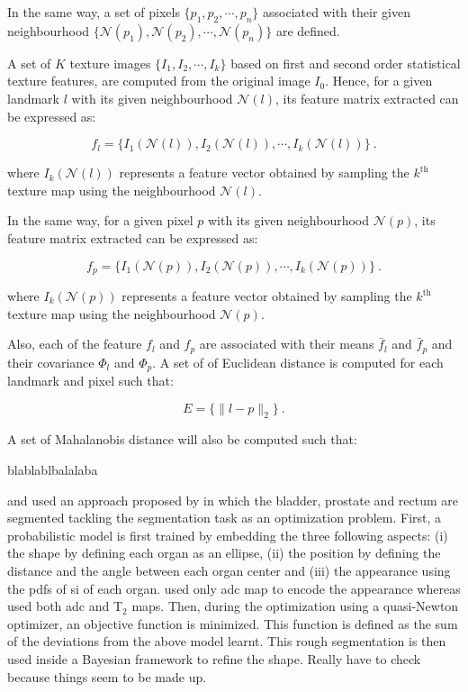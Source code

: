 \begin{enumerate}[leftmargin=*]
In the same way, a set of pixels $\{p_1,p_2,\cdots,p_n\}$ associated with their given neighbourhood $\{\mathcal{N}(p_1),\mathcal{N}(p_2),\cdots,\mathcal{N}(p_n)\}$ are defined. 

A set of $K$ texture images $\{I_1,I_2,\cdots,I_k\}$ based on first and second order statistical texture features, are computed from the original image $I_0$. Hence, for a given landmark $l$ with its given neighbourhood $\mathcal{N}(l)$, its feature matrix extracted can be expressed as:

\begin{equation}
	f_l = \{ I_1(\mathcal{N}(l)), I_2(\mathcal{N}(l)), \cdots, I_k(\mathcal{N}(l)) \} \ .	
	\label{eq:weritas1}
\end{equation}

\noindent where $I_k(\mathcal{N}(l))$ represents a feature vector obtained by sampling the $k^{\text{th}}$ texture map using the neighbourhood $\mathcal{N}(l)$.

In the same way, for a given pixel $p$ with its given neighbourhood $\mathcal{N}(p)$, its feature matrix extracted can be expressed as:

\begin{equation}
	f_p = \{ I_1(\mathcal{N}(p)), I_2(\mathcal{N}(p)), \cdots, I_k(\mathcal{N}(p)) \} \ .	
	\label{eq:weritas2}
\end{equation}

\noindent where $I_k(\mathcal{N}(p))$ represents a feature vector obtained by sampling the $k^{\text{th}}$ texture map using the neighbourhood $\mathcal{N}(p)$.

Also, each of the feature $f_l$ and $f_p$ are associated with their means $\bar{f}_l$ and $\bar{f}_p$ and their covariance $\Phi_l$ and $\Phi_p$. A set of of Euclidean distance is computed for each landmark and pixel such that:

\begin{equation}
	E = \{ \| l - p \|_2 \} \ .
	\label{eq:weritas3}
\end{equation}

A set of Mahalanobis distance will also be computed such that:

blablablbalalaba

\cite{Litjens2011} and \cite{Vos2012} used an approach proposed by \cite{Huisman2010} in which the bladder, prostate and rectum are segmented tackling the segmentation task as an optimization problem. First, a probabilistic model is first trained by embedding the three following aspects: (i) the shape by defining each organ as an ellipse, (ii) the position by defining the distance and the angle between each organ center and (iii) the appearance using the \acp{pdf} of \ac{si} of each organ. \cite{Litjens2011} used only \ac{adc} map to encode the appearance whereas \cite{Vos2012} used both \ac{adc} and T$_2$ maps. Then, during the optimization using a quasi-Newton optimizer, an objective function is minimized. This function is defined as the sum of the deviations from the above model learnt. This rough segmentation is then used inside a Bayesian framework to refine the shape. {\color{red}Really have to check because things seem to be made up.}


\end{enumerate}
